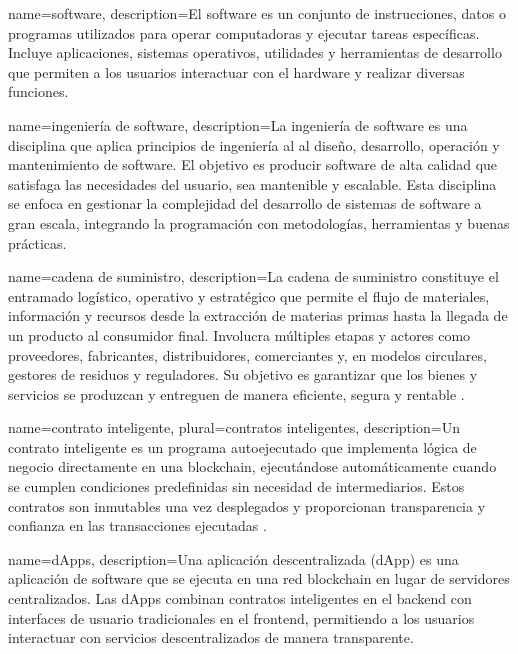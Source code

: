 {
    name=software,
    description={El software es un conjunto de instrucciones, datos o programas utilizados para operar computadoras y ejecutar tareas específicas. Incluye aplicaciones, sistemas operativos, utilidades y herramientas de desarrollo que permiten a los usuarios interactuar con el hardware y realizar diversas funciones.}
}


{
    name=ingeniería de software,
    description={La ingeniería de software es una disciplina que aplica principios de ingeniería al al diseño, desarrollo, operación y mantenimiento de software. El objetivo es producir software de alta calidad que satisfaga las necesidades del usuario, sea mantenible y escalable. Esta disciplina se enfoca en gestionar la complejidad del desarrollo de sistemas de software a gran escala, integrando la programación con metodologías, herramientas y buenas prácticas.}
}

{
    name=cadena de suministro,
    description={La cadena de suministro constituye el entramado logístico, operativo y estratégico que permite el flujo de materiales, información y recursos desde la extracción de materias primas hasta la llegada de un producto al consumidor final. Involucra múltiples etapas y actores como proveedores, fabricantes, distribuidores, comerciantes y, en modelos circulares, gestores de residuos y reguladores. Su objetivo es garantizar que los bienes y servicios se produzcan y entreguen de manera eficiente, segura y rentable \cite{rodriguez2023modelamiento}.}
}

{
    name=contrato inteligente,
    plural=contratos inteligentes,
    description={Un contrato inteligente es un programa autoejecutado que implementa lógica de negocio directamente en una blockchain, ejecutándose automáticamente cuando se cumplen condiciones predefinidas sin necesidad de intermediarios. Estos contratos son inmutables una vez desplegados y proporcionan transparencia y confianza en las transacciones ejecutadas \cite{buterin2013ethereum}.}
}

{
    name=dApps,
    description={Una aplicación descentralizada (dApp) es una aplicación de software que se ejecuta en una red blockchain en lugar de servidores centralizados. Las dApps combinan contratos inteligentes en el backend con interfaces de usuario tradicionales en el frontend, permitiendo a los usuarios interactuar con servicios descentralizados de manera transparente.}
}


